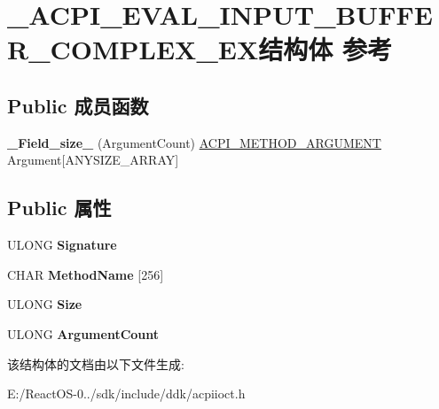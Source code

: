 \hypertarget{struct___a_c_p_i___e_v_a_l___i_n_p_u_t___b_u_f_f_e_r___c_o_m_p_l_e_x___e_x}{}\section{\+\_\+\+A\+C\+P\+I\+\_\+\+E\+V\+A\+L\+\_\+\+I\+N\+P\+U\+T\+\_\+\+B\+U\+F\+F\+E\+R\+\_\+\+C\+O\+M\+P\+L\+E\+X\+\_\+\+E\+X结构体 参考}
\label{struct___a_c_p_i___e_v_a_l___i_n_p_u_t___b_u_f_f_e_r___c_o_m_p_l_e_x___e_x}
\subsection*{Public 成员函数}
\begin{DoxyCompactItemize}
\item 
\mbox{\label{struct___a_c_p_i___e_v_a_l___i_n_p_u_t___b_u_f_f_e_r___c_o_m_p_l_e_x___e_x_ad2851481b3468e7c582adf140d309f79}} 
{\bfseries \+\_\+\+Field\+\_\+size\+\_\+} (Argument\+Count) \hyperlink{struct___a_c_p_i___m_e_t_h_o_d___a_r_g_u_m_e_n_t}{A\+C\+P\+I\+\_\+\+M\+E\+T\+H\+O\+D\+\_\+\+A\+R\+G\+U\+M\+E\+NT} Argument\mbox{[}A\+N\+Y\+S\+I\+Z\+E\+\_\+\+A\+R\+R\+AY\mbox{]}
\end{DoxyCompactItemize}
\subsection*{Public 属性}
\begin{DoxyCompactItemize}
\item 
\mbox{\label{struct___a_c_p_i___e_v_a_l___i_n_p_u_t___b_u_f_f_e_r___c_o_m_p_l_e_x___e_x_a6834f11674fc77324e4d21494fb11c87}} 
U\+L\+O\+NG {\bfseries Signature}
\item 
\mbox{\label{struct___a_c_p_i___e_v_a_l___i_n_p_u_t___b_u_f_f_e_r___c_o_m_p_l_e_x___e_x_a000475100e6858e855e38877d112d12b}} 
C\+H\+AR {\bfseries Method\+Name} \mbox{[}256\mbox{]}
\item 
\mbox{\label{struct___a_c_p_i___e_v_a_l___i_n_p_u_t___b_u_f_f_e_r___c_o_m_p_l_e_x___e_x_ad65dcfb788bbd99f049a34730b7d1d23}} 
U\+L\+O\+NG {\bfseries Size}
\item 
\mbox{\label{struct___a_c_p_i___e_v_a_l___i_n_p_u_t___b_u_f_f_e_r___c_o_m_p_l_e_x___e_x_a1faec26b24b88e732d028e65c02eb3af}} 
U\+L\+O\+NG {\bfseries Argument\+Count}
\end{DoxyCompactItemize}


该结构体的文档由以下文件生成\+:\begin{DoxyCompactItemize}
\item 
E\+:/\+React\+O\+S-\/0../sdk/include/ddk/acpiioct.\+h\end{DoxyCompactItemize}
